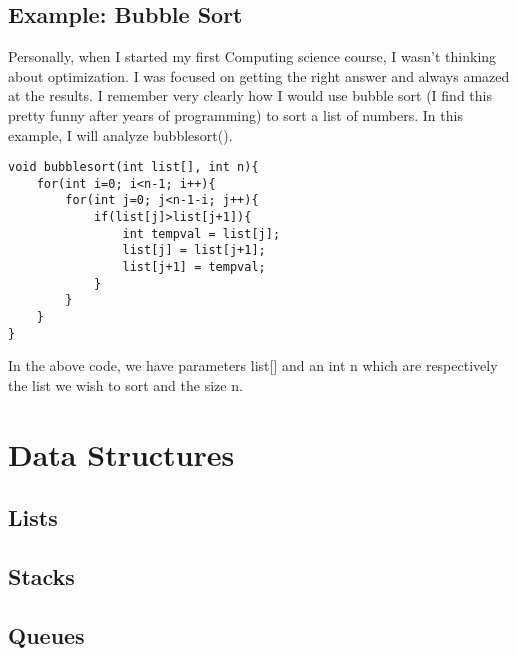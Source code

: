 \documentclass{article}
\begin{document}
\subsection{Example: Bubble Sort}
Personally, when I started my first Computing science course, I wasn't thinking about optimization. I was focused on getting the right answer and always amazed at the results. I remember very clearly how I would use bubble sort (I find this pretty funny after years of programming) to sort a list of numbers. In this example, I will analyze bubblesort(). 

\newpage
\begin{lstlisting}
void bubblesort(int list[], int n){
	for(int i=0; i<n-1; i++){
		for(int j=0; j<n-1-i; j++){
			if(list[j]>list[j+1]){
				int tempval = list[j];
				list[j] = list[j+1];
				list[j+1] = tempval;
			}
		}
	}
}
\end{lstlisting}

\noindent In the above code, we have parameters list[] and an int n which are respectively the list we wish to sort and the size n. 
\section{Data Structures}

\subsection{Lists}
\subsection{Stacks}
\subsection{Queues}
\
\end{document}
